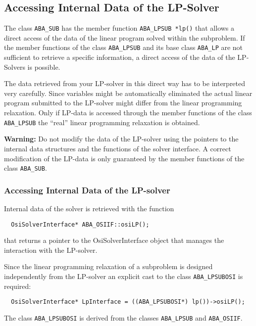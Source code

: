 \subsection{Accessing Internal Data of the LP-Solver}

The class {\tt ABA\_SUB} has the member function {\tt ABA\_LPSUB *lp()} that
allows a direct access of the data of the linear program solved within
the subproblem. If the member functions of the class {\tt ABA\_LPSUB} and
its base class {\tt ABA\_LP} are not sufficient to retrieve a specific 
information, a direct access of the data of the LP-Solvers is possible.

The data retrieved from your LP-solver in this direct way
has to be interpreted very
carefully. Since variables might be automatically eliminated the
actual linear program submitted to the LP-solver might differ from the
linear programming relaxation. Only if LP-data is accessed through the
member functions of the class  {\tt ABA\_LPSUB} the ``real'' linear
programming relaxation is obtained.

{\bf Warning:} Do not modify the data of the LP-solver using the
pointers to the internal data structures and the functions of the
solver interface. A correct modification of the LP-data is only
guaranteed by the member functions of the class {\tt ABA\_SUB}.

\subsubsection{Accessing Internal Data of the LP-solver}

Internal data of the solver is retrieved with the function
\begin{verbatim}
  OsiSolverInterface* ABA_OSIIF::osiLP();
\end{verbatim}
that returns a pointer to the OsiSolverInterface object that manages the
interaction with the LP-solver.

Since the linear programming relaxation of a subproblem is designed
independently from the LP-solver an explicit cast to the class
{\tt ABA\_LPSUBOSI} is required:
\begin{verbatim}
  OsiSolverInterface* LpInterface = ((ABA_LPSUBOSI*) lp())->osiLP();
\end{verbatim}
The class {\tt ABA\_LPSUBOSI} is derived from the classes {\tt ABA\_LPSUB}
and {\tt ABA\_OSIIF}.

